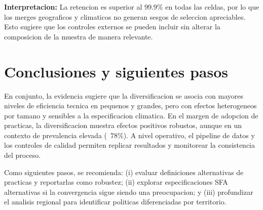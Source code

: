 \documentclass[10pt,a4paper]{article}
\begin{document}
\textbf{Interpretacion:} La retencion es superior al 99.9\% en todas las celdas, por lo que los merges geograficos y climaticos no generan sesgos de seleccion apreciables. Esto sugiere que los controles externos se pueden incluir sin alterar la composicion de la muestra de manera relevante.

\section{Conclusiones y siguientes pasos}
En conjunto, la evidencia sugiere que la diversificacion se asocia con mayores niveles de eficiencia tecnica en pequenos y grandes, pero con efectos heterogeneos por tamano y sensibles a la especificacion climatica. En el margen de adopcion de practicas, la diversificacion muestra efectos positivos robustos, aunque en un contexto de prevalencia elevada (~78\%). A nivel operativo, el pipeline de datos y los controles de calidad permiten replicar resultados y monitorear la consistencia del proceso.

Como siguientes pasos, se recomienda: (i) evaluar definiciones alternativas de practicas y reportarlas como robustez; (ii) explorar especificaciones SFA alternativas si la convergencia sigue siendo una preocupacion; y (iii) profundizar el analisis regional para identificar politicas diferenciadas por territorio.
\end{document}
